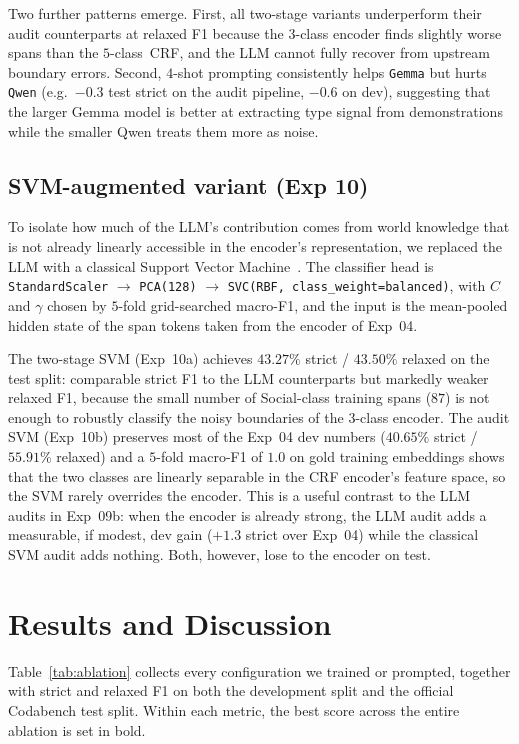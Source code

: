 \documentclass[journal]{IEEEtran}
\begin{document}
Two further patterns emerge. First, all two-stage variants
underperform their audit counterparts at relaxed F1 because the
$3$-class encoder finds slightly worse spans than the
$5$-class~CRF, and the LLM cannot fully recover from upstream
boundary errors. Second, $4$-shot prompting consistently helps
\texttt{Gemma} but hurts \texttt{Qwen} (e.g.~$-0.3$ test strict on
the audit pipeline, $-0.6$ on dev), suggesting that the larger Gemma
model is better at extracting type signal from demonstrations while
the smaller Qwen treats them more as noise.

\subsection{SVM-augmented variant (Exp 10)}
\label{ssec:svm}
To isolate how much of the LLM's contribution comes from world
knowledge that is not already linearly accessible in the encoder's
representation, we replaced the LLM with a classical Support Vector
Machine~\cite{cortes1995svm}. The classifier head is
\texttt{StandardScaler} $\rightarrow$ \texttt{PCA(128)} $\rightarrow$
\texttt{SVC(RBF, class\_weight=balanced)}, with $C$ and $\gamma$
chosen by $5$-fold grid-searched macro-F1, and the input is the
mean-pooled hidden state of the span tokens taken from the encoder
of Exp~04.

The two-stage SVM (Exp~10a) achieves $43.27\%$ strict / $43.50\%$
relaxed on the test split: comparable strict F1 to the LLM
counterparts but markedly weaker relaxed F1, because the small number
of Social-class training spans ($87$) is not enough to robustly
classify the noisy boundaries of the $3$-class encoder. The audit
SVM (Exp~10b) preserves most of the Exp~04 dev numbers
($40.65\%$ strict / $55.91\%$ relaxed) and a $5$-fold macro-F1 of
$1.0$ on gold training embeddings shows that the two classes are
linearly separable in the CRF encoder's feature space, so the SVM
rarely overrides the encoder. This is a useful contrast to the LLM
audits in Exp~09b: when the encoder is already strong, the LLM audit
adds a measurable, if modest, dev gain ($+1.3$ strict over Exp~04)
while the classical SVM audit adds nothing. Both, however, lose to
the encoder on test.

\section{Results and Discussion}
\label{sec:results}

Table~\ref{tab:ablation} collects every configuration we trained or
prompted, together with strict and relaxed F1 on both the development
split and the official Codabench test split. Within each metric, the
best score across the entire ablation is set in bold.
\end{document}

